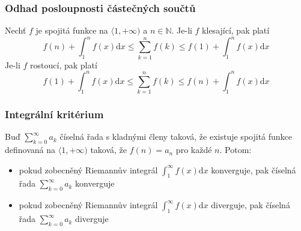 \subsubsection*{Odhad posloupnosti částečných součtů}
Nechť $f$ je spojitá funkce na $\langle 1, +\infty )$ a $n \in \mathbb{N}$. Je-li $f$ klesající, pak platí $$f(n) + \int_1^n f(x)\text{d}x \leq \sum_{k=1}^n f(k) \leq f(1) + \int_1^n f(x)\text{d}x$$
Je-li $f$ rostoucí, pak platí $$f(1) + \int_1^n f(x)\text{d}x \leq \sum_{k=1}^n f(k) \leq f(n) + \int_1^n f(x)\text{d}x$$

\subsubsection*{Integrální kritérium}
Buď $\sum_{k=0}^\infty a_k$ číselná řada s kladnými členy taková, že existuje spojitá funkce definovaná na $\langle 1, +\infty)$ taková, že $f(n) = a_n$ pro každé $n$. Potom:
\begin{itemize}
	\item pokud zobecněný Riemannův integrál $\int_1^\infty f(x)\text{d}x$ konverguje, pak číselná řada $\sum_{k=0}^\infty a_k$ konverguje
	\item pokud zobecněný Riemannův integrál $\int_1^\infty f(x)\text{d}x$ diverguje, pak číselná řada $\sum_{k=0}^\infty a_k$ diverguje
\end{itemize}